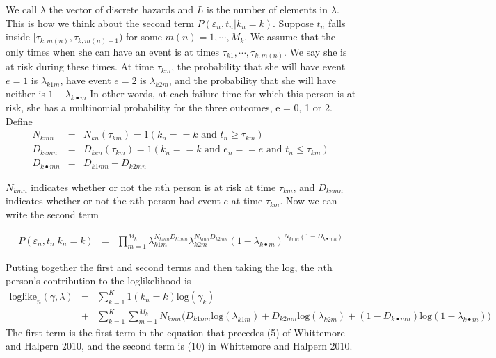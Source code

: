 \documentclass[11pt]{article}
\begin{document}
We call $\lambda$ the vector of discrete hazards and $L$ is the
number of elements in $\lambda$.  This is how we think
about the second term $P(\varepsilon_n, t_n | k_n = k)$.  Suppose $t_n$ falls inside
$[\tau_{k,m(n)}, \tau_{k,m(n)+1})$ for some $m(n) = 1,\cdots, M_k$.  We assume
that the only times when she can have an event is at times $\tau_{k1},
\cdots,\tau_{k,m(n)}$. 
We say she is at risk during these times. At time $\tau_{km}$, 
the probability that she will
have event $e = 1$ is $\lambda_{k1m}$, have event  $e
= 2$ is 
$\lambda_{k2m}$, and the probability that she will have neither is
$1-\lambda_{k \bullet m}$
In other words, at each failure
time for which this person is at risk, she has a multinomial probability
for the three outcomes, e = 0, 1 or 2. Define
\begin{eqnarray}
N_{kmn} & = & N_{kn}(\tau_{km}) = 1(k_n == k \mbox{ and } t_n \ge
                       \tau_{km})\\
D_{kemn} & = & D_{ken}(\tau_{km}) = 1(k_n == k \mbox{ and } e_n == e
                        \mbox{ and } t_n \le \tau_{km})\\
D_{k \bullet mn} & = & D_{k1mn} + D_{k2mn}
\end{eqnarray}

$N_{kmn}$ indicates whether or not the $n$th person is at risk at time
$\tau_{km}$, and $D_{kemn}$ indicates whether or not the $n$th person had
event $e$ at time $\tau_{km}$. 
Now we can write the
second term

\begin{eqnarray}
P(\varepsilon_n, t_n | k_n = k) & = & \prod_{m = 1}^{M_k} 
                \lambda_{k1m}^{N_{kmn}D_{k1mn}} \lambda_{k2m}^{N_{kmn}D_{k2mn}}
                 (1-\lambda_{k \bullet m})^{N_{kmn}(1-D_{k \bullet mn})}
\end{eqnarray}

Putting together the first and second terms and then taking the log, 
the $n$th person's contribution to the loglikelihood is
\begin{eqnarray}
\mbox{loglike}_n(\gamma, \lambda) & = & 
                \sum_{k=1}^{K}1(k_n = k)
                \mbox{log}(\gamma_k) \nonumber \\
       & + & \sum_{k=1}^{K} \sum_{m=1}^{M_k} N_{kmn}\Biggl( 
                D_{k1mn} \mbox{log}(\lambda_{k1m}) +
                D_{k2mn} \mbox{log}(\lambda_{k2m}) +
                (1 - D_{k\bullet mn}) \mbox{log}(1-\lambda_{k\bullet m})
                \Biggr)
\end{eqnarray}
The first term is the first term in the equation that precedes (5) of
Whittemore and Halpern 2010,
and the second term is (10) in Whittemore and Halpern 2010.
\end{document}
